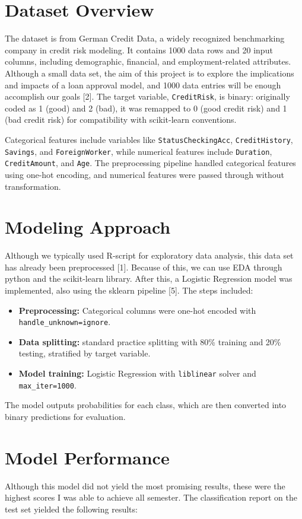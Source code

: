 \documentclass[12pt]{article}
\begin{document}
	\section{Dataset Overview}
	The dataset is from German Credit Data, a widely recognized benchmarking company in credit risk modeling. It contains 1000 data rows and 20 input columns, including demographic, financial, and employment-related attributes. Although a small data set, the aim of this project is to explore the implications and impacts of a loan approval model, and 1000 data entries will be enough accomplish our goals [2]. The target variable, \texttt{CreditRisk}, is binary: originally coded as 1 (good) and 2 (bad), it was remapped to 0 (good credit risk) and 1 (bad credit risk) for compatibility with scikit-learn conventions.
	
	Categorical features include variables like \texttt{StatusCheckingAcc}, \texttt{CreditHistory}, \texttt{Savings}, and \texttt{ForeignWorker}, while numerical features include \texttt{Duration}, \texttt{CreditAmount}, and \texttt{Age}. The preprocessing pipeline handled categorical features using one-hot encoding, and numerical features were passed through without transformation.
	
	\section{Modeling Approach}
	Although we typically used R-script for exploratory data analysis, this data set has already been preprocessed [1]. Because of this, we can use EDA through python and the scikit-learn library. After this, a Logistic Regression model was implemented, also using the sklearn pipeline [5]. The steps included:
	\begin{itemize}
		\item \textbf{Preprocessing:} Categorical columns were one-hot encoded with \texttt{handle\_unknown=\textquotesingle ignore\textquotesingle}.
		\item \textbf{Data splitting:} standard practice splitting with 80\% training and 20\% testing, stratified by target variable.
		\item \textbf{Model training:} Logistic Regression with \texttt{liblinear} solver and \texttt{max\_iter=1000}.
	\end{itemize}
	
	The model outputs probabilities for each class, which are then converted into binary predictions for evaluation.
	
	\section{Model Performance}
	Although this model did not yield the most promising results, these were the highest scores I was able to achieve all semester. The classification report on the test set yielded the following results:
	
\end{document}
